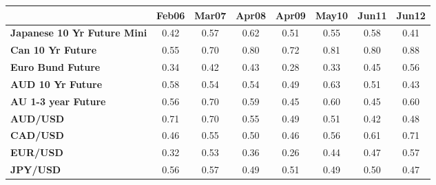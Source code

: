 \begin{scriptsize}
\begin{tabular}{lccccccc}
&\textbf{Feb06}&\textbf{Mar07}&\textbf{Apr08}&\textbf{Apr09}&\textbf{May10}&\textbf{Jun11}&\textbf{Jun12}\\\hline
\textbf{Japanese 10 Yr Future Mini}&0.42&0.57&0.62&0.51&0.55&0.58&0.41\\
\textbf{Can 10 Yr Future}&0.55&0.70&0.80&0.72&0.81&0.80&0.88\\
\textbf{Euro Bund Future}&0.34&0.42&0.43&0.28&0.33&0.45&0.56\\
\textbf{AUD 10 Yr Future}&0.58&0.54&0.54&0.49&0.63&0.51&0.43\\
\textbf{AU 1-3 year Future}&0.56&0.70&0.59&0.45&0.60&0.45&0.60\\
\textbf{AUD/USD}&0.71&0.70&0.55&0.49&0.51&0.42&0.48\\
\textbf{CAD/USD}&0.46&0.55&0.50&0.46&0.56&0.61&0.71\\
\textbf{EUR/USD}&0.32&0.53&0.36&0.26&0.44&0.47&0.57\\
\textbf{JPY/USD}&0.56&0.57&0.49&0.51&0.49&0.50&0.47\\
\end{tabular}
\end{scriptsize}
